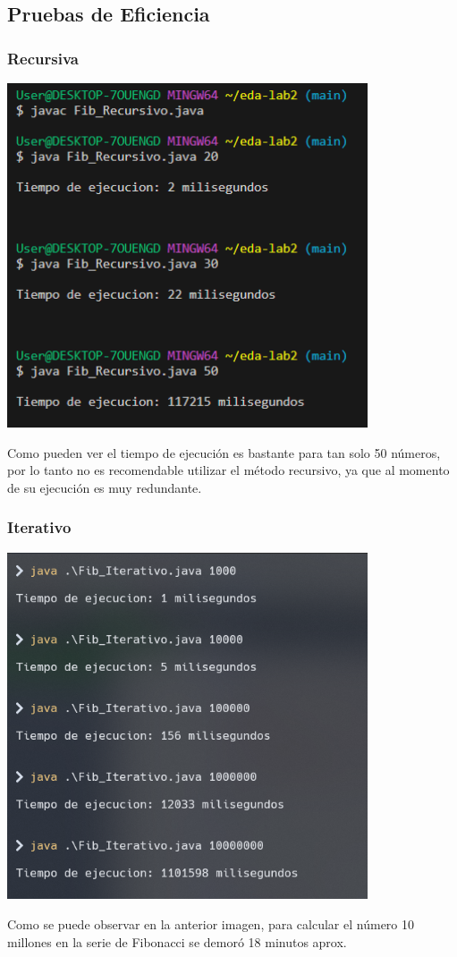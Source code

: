 \documentclass{article}
\begin{document}
        \subsection{Pruebas de Eficiencia}
            \subsubsection{Recursiva}
            \begin{center}
                \includegraphics[width=0.8\textwidth]{img/tmp_recursivo.png}
            \end{center}
            Como pueden ver el tiempo de ejecución es bastante para tan solo 50 números, por lo tanto no es recomendable utilizar el método recursivo, ya que al momento de su ejecución es muy redundante.
            
            \subsubsection{Iterativo}
            \begin{center}
                \includegraphics[width=0.8\textwidth]{img/tmp_iterativo.png}
            \end{center}
            Como se puede observar en la anterior imagen, para calcular el número 10 millones en la serie de Fibonacci se demoró 18 minutos aprox. 
\end{document}
